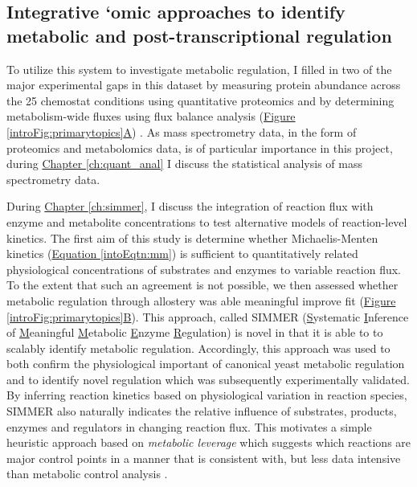 \subsection{Integrative `omic approaches to identify metabolic and post-transcriptional regulation}

To utilize this system to investigate metabolic regulation, I filled in two of the major experimental gaps in this dataset by measuring protein abundance across the 25 chemostat conditions using quantitative proteomics and by determining metabolism-wide fluxes using flux balance analysis (\hyperref[introFig:primarytopics]{Figure \ref{introFig:primarytopics}A}) \cite{Orth:2010hb}. As mass spectrometry data, in the form of proteomics and metabolomics data, is of particular importance in this project, during \hyperref[ch:quant_anal]{Chapter \ref{ch:quant_anal}} I discuss the statistical analysis of mass spectrometry data. 

During \hyperref[ch:simmer]{Chapter \ref{ch:simmer}}, I discuss the integration of reaction flux with enzyme and metabolite concentrations to test alternative models of reaction-level kinetics. The first aim of this study is determine whether Michaelis-Menten kinetics (\hyperref[intoEqtn:mm]{Equation \ref{intoEqtn:mm}}) is sufficient to quantitatively related physiological concentrations of substrates and enzymes to variable reaction flux.  To the extent that such an agreement is not possible, we then assessed whether metabolic regulation through allostery was able meaningful improve fit (\hyperref[introFig:primarytopics]{Figure \ref{introFig:primarytopics}B}).  This approach, called SIMMER (\underline{S}ystematic \underline{I}nference of \underline{M}eaningful \underline{M}etabolic \underline{E}nzyme \underline{R}egulation) is novel in that it is able to to scalably identify metabolic regulation. Accordingly, this approach was used to both confirm the physiological important of canonical yeast metabolic regulation and to identify novel regulation which was subsequently experimentally validated. By inferring reaction kinetics based on physiological variation in reaction species, SIMMER also naturally indicates the relative influence of substrates, products, enzymes and regulators in changing reaction flux. This motivates a simple heuristic approach based on \textit{metabolic leverage} which suggests which reactions are major control points in a manner that is consistent with, but less data intensive than metabolic control analysis \cite{Fell:1997wg}.

